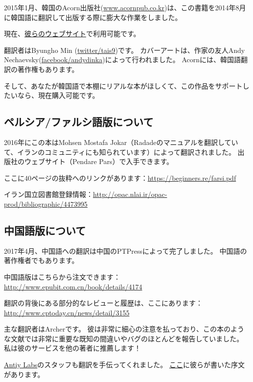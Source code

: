 2015年1月、韓国のAcorn出版社(\href{http://www.acornpub.co.kr}{www.acornpub.co.kr})は、この書籍を2014年8月に韓国語に翻訳して出版する際に膨大な作業をしました。

現在、\href{http://go.yurichev.com/17343}{彼らのウェブサイト}で利用可能です。

翻訳者はByungho Min (\href{http://go.yurichev.com/17344}{twitter/tais9})です。 カバーアートは、作家の友人Andy Nechaevsky(\href{http://go.yurichev.com/17023}{facebook/andydinka})によって行われました。 Acornには、韓国語翻訳の著作権もあります。

そして、あなたが韓国語で本棚にリアルな本がほしくて、この作品をサポートしたいなら、現在購入可能です。

\subsection*{ペルシア/ファルシ語版について}

2016年にこの本はMohsen Mostafa Jokar（Radadeのマニュアルを翻訳していて、イランのコミュニティにも知られています）によって翻訳されました。 出版社のウェブサイト（Pendare Pars）で入手できます。

ここに40ページの抜粋へのリンクがあります：\url{https://beginners.re/farsi.pdf}

イラン国立図書館登録情報：\url{http://opac.nlai.ir/opac-prod/bibliographic/4473995}

\subsection*{中国語版について}

2017年4月、中国語への翻訳は中国のPTPressによって完了しました。 中国語の著作権者でもあります。

中国語版はこちらから注文できます：\url{http://www.epubit.com.cn/book/details/4174}

翻訳の背後にある部分的なレビューと履歴は、ここにあります：\url{http://www.cptoday.cn/news/detail/3155}

主な翻訳者はArcherです。 彼は非常に細心の注意を払っており、この本のような文献では非常に重要な既知の間違いやバグのほとんどを報告していました。 私は彼のサービスを他の著者に推薦します！

\href{http://www.antiy.net/}{Antiy Labs}のスタッフも翻訳を手伝ってくれました。 \href{http://www.epubit.com.cn/book/onlinechapter/51413}{ここ}に彼らが書いた序文があります。
